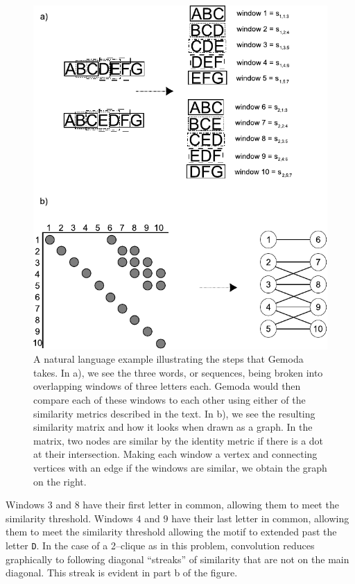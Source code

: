     \begin{figure}[p!]
        \centering
        \includegraphics[width=\textwidth]{Body/Images-chap3/responseexample.pdf}
        \caption[A natural language example illustrating the
            steps that Gemoda takes]{A natural language example illustrating the
            steps that Gemoda takes.  In a), we see the three words,
        or sequences, being broken into overlapping windows of
        three letters each.  Gemoda would then compare each of these
        windows to each other using either of the similarity metrics
        described in the text.  In b), we see the resulting
        similarity matrix and how it looks when drawn as a graph.
        In the matrix, two nodes are similar by the identity metric
        if there is a dot at their intersection.  Making each window a vertex
        and connecting vertices with an edge if the windows are
        similar, we obtain the graph on the right.
        }\label{fig:response}
    \end{figure}

    Windows $3$ and $8$
    have their first letter in common, allowing them to meet the
    similarity threshold.  Windows $4$ and $9$ have their last letter
    in common, allowing them to meet the similarity threshold
    allowing the motif to extended past the letter \texttt{D}.  In the
    case of a 2--clique as in this problem, convolution reduces graphically
    to following diagonal ``streaks'' of similarity that are not on
    the main diagonal.  This streak is evident in part b of the figure.

